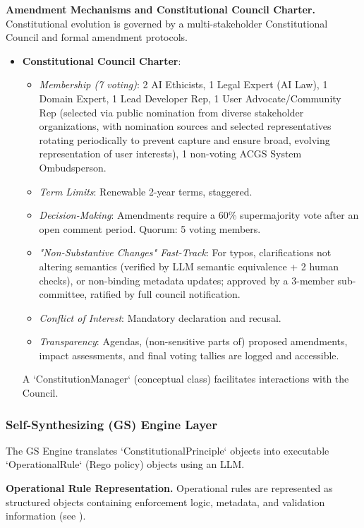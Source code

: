 \documentclass[sigconf,natbib]{acmart}
\begin{document}
\textbf{Amendment Mechanisms and Constitutional Council Charter.} Constitutional evolution is governed by a multi-stakeholder Constitutional Council and formal amendment protocols.
\begin{itemize}
    \item \textbf{Constitutional Council Charter}:
    \begin{itemize}
        \item \textit{Membership (7 voting)}: 2 AI Ethicists, 1 Legal Expert (AI Law), 1 Domain Expert, 1 Lead Developer Rep, 1 User Advocate/Community Rep (selected via public nomination from diverse stakeholder organizations, with nomination sources and selected representatives rotating periodically to prevent capture and ensure broad, evolving representation of user interests), 1 non-voting ACGS System Ombudsperson.
        \item \textit{Term Limits}: Renewable 2-year terms, staggered.
        \item \textit{Decision-Making}: Amendments require a 60\% supermajority vote after an open comment period. Quorum: 5 voting members.
        \item \textit{"Non-Substantive Changes" Fast-Track}: For typos, clarifications not altering semantics (verified by LLM semantic equivalence + 2 human checks), or non-binding metadata updates; approved by a 3-member sub-committee, ratified by full council notification.
        \item \textit{Conflict of Interest}: Mandatory declaration and recusal.
        \item \textit{Transparency}: Agendas, (non-sensitive parts of) proposed amendments, impact assessments, and final voting tallies are logged and accessible.
    \end{itemize}
    A `ConstitutionManager` (conceptual class) facilitates interactions with the Council.
\end{itemize}

\subsubsection{Self-Synthesizing (GS) Engine Layer}
The GS Engine translates `ConstitutionalPrinciple` objects into executable `OperationalRule` (Rego policy) objects using an LLM.

\textbf{Operational Rule Representation.} Operational rules are represented as structured objects containing enforcement logic, metadata, and validation information (see ).
\end{document}

